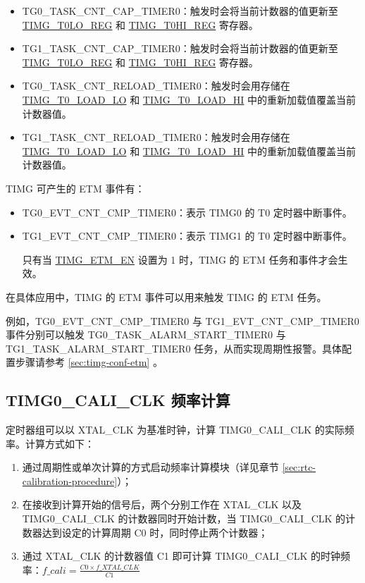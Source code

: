 \documentclass[main\_\_CN.tex]{subfiles}
\begin{document}
\begin{itemize}
\item TG0\_TASK\_CNT\_CAP\_TIMER0：触发时会将当前计数器的值更新至 \hyperref[regdesc:TIMGTXLOREG]{TIMG\_T0LO\_REG} 和 \hyperref[regdesc:TIMGTXHIREG]{TIMG\_T0HI\_REG} 寄存器。
\item TG1\_TASK\_CNT\_CAP\_TIMER0：触发时会将当前计数器的值更新至 \hyperref[regdesc:TIMGTXLOREG]{TIMG\_T0LO\_REG} 和 \hyperref[regdesc:TIMGTXHIREG]{TIMG\_T0HI\_REG} 寄存器。
\item TG0\_TASK\_CNT\_RELOAD\_TIMER0：触发时会用存储在 \hyperref[fielddesc:TIMGTXLOADLO]{TIMG\_T0\_LOAD\_LO} 和 \hyperref[fielddesc:TIMGTXLOADHI]{TIMG\_T0\_LOAD\_HI} 中的重新加载值覆盖当前计数器值。
\item TG1\_TASK\_CNT\_RELOAD\_TIMER0：触发时会用存储在 \hyperref[fielddesc:TIMGTXLOADLO]{TIMG\_T0\_LOAD\_LO} 和 \hyperref[fielddesc:TIMGTXLOADHI]{TIMG\_T0\_LOAD\_HI} 中的重新加载值覆盖当前计数器值。
\end{itemize}

TIMG 可产生的 ETM 事件有：

\begin{itemize}
    \item TG0\_EVT\_CNT\_CMP\_TIMER0：表示 TIMG0 的 T0 定时器中断事件。
    \item TG1\_EVT\_CNT\_CMP\_TIMER0：表示 TIMG1 的 T0 定时器中断事件。

\begin{tiplisting}
只有当 \hyperref[fielddesc:TIMGETMEN]{TIMG\_ETM\_EN} 设置为 1 时，TIMG 的 ETM 任务和事件才会生效。
\end{tiplisting}
\end{itemize}

在具体应用中，TIMG 的 ETM 事件可以用来触发 TIMG 的 ETM 任务。

例如，TG0\_EVT\_CNT\_CMP\_TIMER0 与 TG1\_EVT\_CNT\_CMP\_TIMER0 事件分别可以触发 TG0\_TASK\_ALARM\_START\_TIMER0 与 TG1\_TASK\_ALARM\_START\_TIMER0 任务，从而实现周期性报警。具体配置步骤请参考 \ref{sec:timg-conf-etm} 。


\subsection{TIMG0\_CALI\_CLK 频率计算}\label{sec:rtc-calibration-desc}
定时器组可以以 XTAL\_CLK 为基准时钟，计算 TIMG0\_CALI\_CLK 的实际频率。计算方式如下：
\begin{enumerate}
    \item 通过周期性或单次计算的方式启动频率计算模块（详见章节 \ref{sec:rtc-calibration-procedure}）；
    \item 在接收到计算开始的信号后，两个分别工作在 XTAL\_CLK 以及 TIMG0\_CALI\_CLK 的计数器同时开始计数，当 TIMG0\_CALI\_CLK 的计数器达到设定的计算周期 C0 时，同时停止两个计数器；
    \item 通过 XTAL\_CLK 的计数器值 C1 即可计算 TIMG0\_CALI\_CLK 的时钟频率：$f\_cali = \frac{C0 \times f\_XTAL\_CLK}{C1}$
\end{enumerate}
\end{document}
